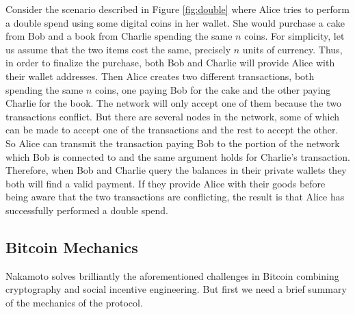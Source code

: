 \bigskip
\noindent
Consider the scenario described in Figure \ref{fig:double} where Alice tries to perform a double spend using some digital coins in her wallet. She would purchase a cake from Bob and a book from Charlie spending the same $n$ coins. For simplicity, let us assume that the two items cost the same, precisely $n$ units of currency. Thus, in order to finalize the purchase, both Bob and Charlie will provide Alice with their wallet addresses. Then Alice creates two different transactions, both spending the same $n$ coins, one paying Bob for the cake and the other paying Charlie for the book. The network will only accept one of them because the two transactions conflict. But there are several nodes in the network, some of which can be made to accept one of the transactions and the rest to accept the other. So Alice can transmit the transaction paying Bob to the portion of the network which Bob is connected to and the same argument holds for Charlie's transaction. Therefore, when Bob and Charlie query the balances in their private wallets they both will find a valid payment. If they provide Alice with their goods before being aware that the two transactions are conflicting, the result is that Alice has successfully performed a double spend.

\bigskip
\subsection{Bitcoin Mechanics}
Nakamoto solves brilliantly the aforementioned challenges in Bitcoin combining cryptography and social incentive engineering. But first we need a brief summary of the mechanics of the protocol.